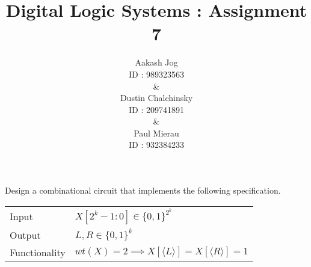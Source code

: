 \documentclass[fleqn, a4paper, 11pt, oneside]{amsart}
\title{Digital Logic Systems : Assignment 7}
\author{
	Aakash Jog\\
	ID : 989323563\\
	\&\\
	Dustin Chalchinsky\\
	ID : 209741891\\
	\&\\
	Paul Mierau\\
	ID : 932384233
	}
\date{\formatdate{7}{6}{2015}}
\theoremstyle{definition}
\theoremstyle{theorem}
\theoremstyle{remark}
\begin{document}
	
\maketitle

\begin{question}
	Design a combinational circuit that implements the following specification.
	\begin{tabular}{l l}
		        Input & $X[2^k - 1 : 0] \in \{0,1\}^{2^k}$                                                             \\
		       Output & $L, R \in \{0,1\}^k$                                                                           \\
		Functionality & $wt(X) = 2 \implies X\left[ \langle L \rangle \right] = X\left[ \langle R \rangle \right] = 1$ \\
	\end{tabular}
\end{question}

\def\demux#1#2{
	\begin{scope}[shift = {#1}, rotate = {#2}]
		\draw (-0.5,0.5) -- (-0.5,-0.5) -- (0.5,-1) -- (0.5,1) -- cycle;

		\draw (-0.5,0) -- (-1,0);

		\draw (0.5,0.5) -- (1,0.5);
		\draw (0.5,-0.5) -- (1,-0.5);

		\draw (0,-0.75) -- (0,-1);

		\node [left] at (0.5,0.5) {\tiny{$0$}};
		\node [left] at (0.5,-0.5) {\tiny{$1$}};

		\node at (0,0) {\tiny{$\textsc{demux}$}};
	\end{scope}
}

\def\JO#1#2#3{
	\begin{scope}[shift = {#1}, rotate = {#2}]
		\draw (-1,-1) rectangle (1,1);

		\draw (-1,0) -- (-2,0);

		\draw (1,0.5) -- (2,0.5);
		\draw (1,-0.5) -- (2,-0.5);

		\node [left] at (1,0.5) {\tiny{$y$}};
		\node [left] at (1,-0.5) {\tiny{$z$}};
		\node at (0,0) {$JO(${#3}$)$};
	\end{scope}
}
\end{document}

